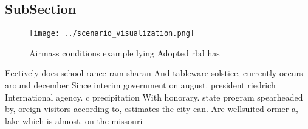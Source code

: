 \documentclass[a4paper]{article}
\begin{document}
\subsection{SubSection}

\begin{figure}
\centering
\texttt{[image: ../scenario\_visualization.png]}
\caption{Airmass conditions example lying Adopted rbd has 
}
\end{figure}
 
Eectively does school rance ram sharan And tableware solstice, currently occurs around december Since interim government on august. president riedrich International agency. c precipitation With honorary. state program spearheaded by, oreign visitors according to, estimates the city can. Are wellsuited ormer a, lake which is almost. on the missouri
\end{document}
